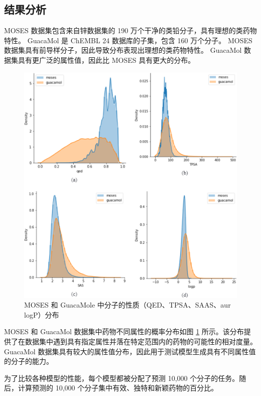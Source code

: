 \begin{translation}
\subsection{结果分析}

MOSES 数据集包含来自锌数据集的 190 万个干净的类铅分子，具有理想的类药物特性。 GuacaMol 是 ChEMBL 24 数据库的子集，包含 160 万个分子。 MOSES 数据集具有前导样分子，因此导致分布表现出理想的类药物特性。 GuacaMol 数据集具有更广泛的属性值，因此比 MOSES 具有更大的分布。

\begin{figure}[H]
  \centering
  \includegraphics[width=\linewidth]{figures/2.png}
  \caption{MOSES 和 GuacaMole 中分子的性质（QED、TPSA、SAAS、aur logP）分布}
  \label{fig:2}
\end{figure}

MOSES 和 GuacaMol 数据集中药物不同属性的概率分布如图 \ref{fig:2} 所示。该分布提供了在数据集中遇到具有指定属性并落在特定范围内的药物的可能性的相对度量。 GuacaMol 数据集具有较大的属性值分布，因此用于测试模型生成具有不同属性值的分子的能力。

为了比较各种模型的性能，每个模型都被分配了预测 10,000 个分子的任务。随后，计算预测的 10,000 个分子集中有效、独特和新颖药物的百分比。


\end{translation}
